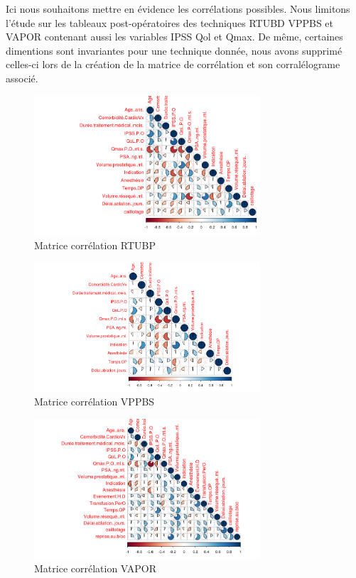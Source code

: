 %
%

Ici nous souhaitons mettre en évidence les corrélations possibles.
Nous limitons l’étude sur les tableaux post-opératoires des techniques RTUBD VPPBS et VAPOR contenant 
aussi les variables IPSS Qol et Qmax.
De même, certaines dimentions sont invariantes pour une technique donnée, nous avons supprimé celles-ci lors de la création 
de la matrice de corrélation et son corralélograme associé.

\begin{figure}[H]
\centering
\includegraphics[width=0.75\textwidth]{../Fig/RTUPB/rtupb-corr-matrice-pie}
\caption{Matrice corrélation RTUBP}
\end{figure}

\begin{figure}[H]
\centering
\includegraphics[width=0.75\textwidth]{../Fig/VPPBS/vppbs-corr-matrice-pie}
\caption{Matrice corrélation VPPBS}
\end{figure}

\begin{figure}[H]
\centering
\includegraphics[width=0.75\textwidth]{../Fig/VAPOR/vapor-corr-matrice-pie}
\caption{Matrice corrélation VAPOR}
\end{figure}


